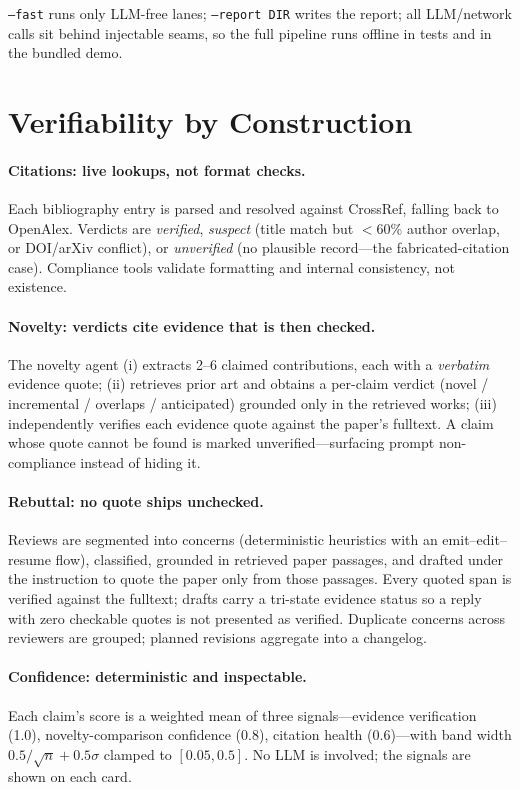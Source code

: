 \documentclass[11pt]{article}
\begin{document}
\texttt{--fast} runs only LLM-free lanes; \texttt{--report DIR} writes the report; all LLM/network calls sit behind injectable seams, so the full pipeline runs offline in tests and in the bundled demo.

\section{Verifiability by Construction}
\paragraph{Citations: live lookups, not format checks.} Each bibliography entry is parsed and resolved against CrossRef, falling back to OpenAlex. Verdicts are \emph{verified}, \emph{suspect} (title match but $<$60\% author overlap, or DOI/arXiv conflict), or \emph{unverified} (no plausible record---the fabricated-citation case). Compliance tools validate formatting and internal consistency, not existence.

\paragraph{Novelty: verdicts cite evidence that is then checked.} The novelty agent (i) extracts 2--6 claimed contributions, each with a \emph{verbatim} evidence quote; (ii) retrieves prior art and obtains a per-claim verdict (novel / incremental / overlaps / anticipated) grounded only in the retrieved works; (iii) independently verifies each evidence quote against the paper's fulltext. A claim whose quote cannot be found is marked unverified---surfacing prompt non-compliance instead of hiding it.

\paragraph{Rebuttal: no quote ships unchecked.} Reviews are segmented into concerns (deterministic heuristics with an emit--edit--resume flow), classified, grounded in retrieved paper passages, and drafted under the instruction to quote the paper only from those passages. Every quoted span is verified against the fulltext; drafts carry a tri-state evidence status so a reply with zero checkable quotes is not presented as verified. Duplicate concerns across reviewers are grouped; planned revisions aggregate into a changelog.

\paragraph{Confidence: deterministic and inspectable.} Each claim's score is a weighted mean of three signals---evidence verification (1.0), novelty-comparison confidence (0.8), citation health (0.6)---with band width $0.5/\sqrt{n} + 0.5\sigma$ clamped to $[0.05, 0.5]$. No LLM is involved; the signals are shown on each card.
\end{document}
